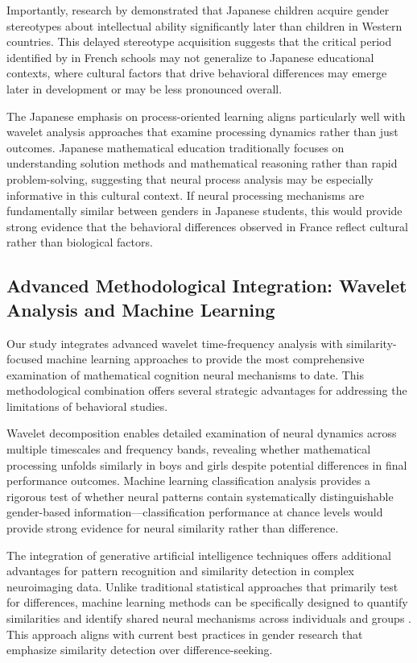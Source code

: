 \documentclass[pdflatex,reference]{sn-jnl}%
\theoremstyle{thmstyleone}%
\theoremstyle{thmstyletwo}%
\theoremstyle{thmstylethree}%
\begin{document}
Importantly, research by \cite{tatsuno2022development} demonstrated that Japanese children acquire gender stereotypes about intellectual ability significantly later than children in Western countries. This delayed stereotype acquisition suggests that the critical period identified by \cite{martinot2025mathematical} in French schools may not generalize to Japanese educational contexts, where cultural factors that drive behavioral differences may emerge later in development or may be less pronounced overall.

The Japanese emphasis on process-oriented learning aligns particularly well with wavelet analysis approaches that examine processing dynamics rather than just outcomes. Japanese mathematical education traditionally focuses on understanding solution methods and mathematical reasoning rather than rapid problem-solving, suggesting that neural process analysis may be especially informative in this cultural context. If neural processing mechanisms are fundamentally similar between genders in Japanese students, this would provide strong evidence that the behavioral differences observed in France reflect cultural rather than biological factors.


\subsection{Advanced Methodological Integration: Wavelet Analysis and Machine Learning}
Our study integrates advanced wavelet time-frequency analysis with similarity-focused machine learning approaches to provide the most comprehensive examination of mathematical cognition neural mechanisms to date. This methodological combination offers several strategic advantages for addressing the limitations of behavioral studies.

Wavelet decomposition enables detailed examination of neural dynamics across multiple timescales and frequency bands, revealing whether mathematical processing unfolds similarly in boys and girls despite potential differences in final performance outcomes. Machine learning classification analysis provides a rigorous test of whether neural patterns contain systematically distinguishable gender-based information—classification performance at chance levels would provide strong evidence for neural similarity rather than difference.

The integration of generative artificial intelligence techniques offers additional advantages for pattern recognition and similarity detection in complex neuroimaging data. Unlike traditional statistical approaches that primarily test for differences, machine learning methods can be specifically designed to quantify similarities and identify shared neural mechanisms across individuals and groups \cite{poldrack2020establishment}. This approach aligns with current best practices in gender research that emphasize similarity detection over difference-seeking.
\end{document}
